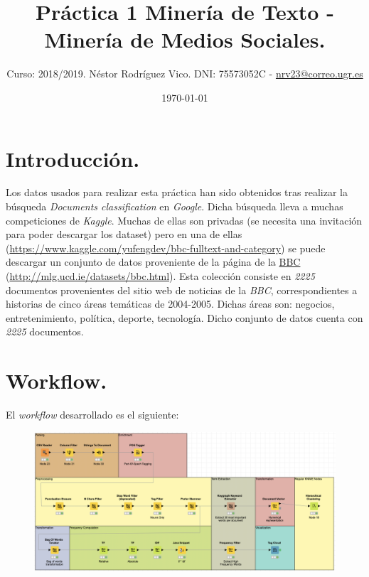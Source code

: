 \documentclass[11pt]{article}
\title{Práctica 1 Minería de Texto - Minería de Medios Sociales.}
\author{Curso: 2018/2019. Néstor Rodríguez Vico. DNI: 75573052C - \href{mailto:nrv23@correo.ugr.es}{nrv23@correo.ugr.es}}
\date{\today}
\begin{document}
\maketitle

\setlength{\belowdisplayskip}{5pt} 
\setlength{\belowdisplayshortskip}{5pt}
\setlength{\abovedisplayskip}{5pt} 
\setlength{\abovedisplayshortskip}{5pt}

\section{Introducción.}

Los datos usados para realizar esta práctica han sido obtenidos tras realizar la búsqueda \textit{Documents classification} en \textit{Google}. Dicha búsqueda lleva a muchas competiciones de \textit{Kaggle}. Muchas de ellas son privadas (se necesita una invitación para poder descargar los dataset) pero en una de ellas (\href{https://www.kaggle.com/yufengdev/bbc-fulltext-and-category}{https://www.kaggle.com/yufengdev/bbc-fulltext-and-category}) se puede descargar un conjunto de datos proveniente de la página de la \href{http://mlg.ucd.ie/datasets/bbc.html}{BBC} (\href{http://mlg.ucd.ie/datasets/bbc.html}{http://mlg.ucd.ie/datasets/bbc.html}). Esta colección consiste en \textit{2225} documentos provenientes del sitio web de noticias de la  \textit{BBC}, correspondientes a historias de cinco áreas temáticas de 2004-2005. Dichas áreas son: negocios, entretenimiento, política, deporte, tecnología. Dicho conjunto de datos cuenta con \textit{2225} documentos.

\section{Workflow.}

El \textit{workflow} desarrollado es el siguiente:

\begin{figure}[H]
	\centering
	\includegraphics[width=\linewidth]{images/workflow.png}
\end{figure}
\end{document}

